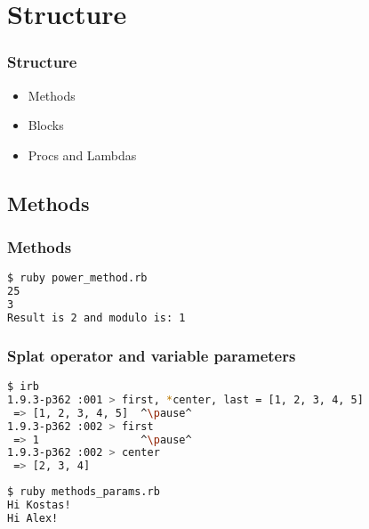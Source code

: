 \section{Structure} 
\begin{frame}\frametitle{Structure} 
\begin{itemize}
\item Methods
\item Blocks
\item Procs and Lambdas
\end{itemize}
\end{frame}





\subsection{Methods}
\begin{frame}[fragile]\frametitle{Methods}


\pause
\begin{lstlisting}[language=bash]
$ ruby power_method.rb 
25
3
Result is 2 and modulo is: 1
\end{lstlisting}

\end{frame}


\begin{frame}[fragile]\frametitle{Splat operator and variable parameters}

\begin{lstlisting}[language=bash, escapechar={^}]
$ irb
1.9.3-p362 :001 > first, *center, last = [1, 2, 3, 4, 5]
 => [1, 2, 3, 4, 5]  ^\pause^
1.9.3-p362 :002 > first
 => 1                ^\pause^
1.9.3-p362 :002 > center
 => [2, 3, 4] 
\end{lstlisting}
\pause


\pause

\begin{lstlisting}[language=bash]
$ ruby methods_params.rb 
Hi Kostas!
Hi Alex!
\end{lstlisting}

\end{frame}





